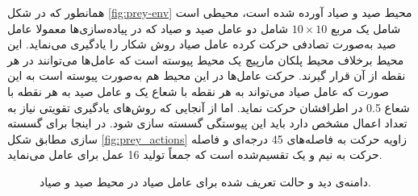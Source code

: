 همانطور که در شکل \ref{fig:prey-env} محیط صید و صیاد آورده شده است، محیطی است شامل یک مربع $10\times 10$ شامل دو عامل صید و صیاد که در پیاده‌سازی‌ها معمولا عامل صید به‌صورت تصادفی حرکت کرده عامل صیاد روش شکار را یادگیری می‌نماید. این محیط برخلاف محیط پلکان مارپیچ یک محیط پیوسته است که عامل‌ها می‌توانند در هر نقطه از آن قرار گیرند. حرکت عامل‌ها در این محیط هم به‌صورت پیوسته است به این صورت که عامل صیاد می‌تواند به هر نقطه با شعاع یک و عامل صید به هر نقطه با شعاع 0.5 در اطرافشان حرکت نماید. اما از آنجایی که روش‌های یادگیری تقویتی نیاز به تعداد اعمال مشخص دارد باید این پیوستگی گسسته سازی شود. در اینجا برای گسسته سازی مطابق شکل \ref{fig:prey_actions} زاویه حرکت به فاصله‌های 45 درجه‌ای و فاصله حرکت به نیم و یک تقسیم‌شده است که جمعاً تولید 16 عمل برای عامل می‌نماید.


\begin{figure}
\centering
{}
\caption{دامنه‌ی دید و حالت تعریف شده برای عامل صیاد در محیط صید و صیاد.}
\label{fig:prey_actions_vision}
\end{figure}

